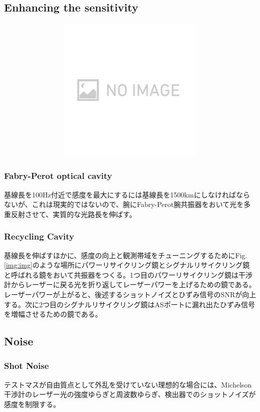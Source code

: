 \subsection{Enhancing the sensitivity}
\begin{figure}[h]
  \begin{center}   
    \includegraphics[width=12cm,height=7cm]{./img.png}
    \caption{}{} \label{img:img133}
  \end{center}
\end{figure}

\subsubsection{Fabry-Perot optical cavity}
基線長を100Hz付近で感度を最大にするには基線長を1500kmにしなければならないが、これは現実的ではないので、腕にFabry-Perot腕共振器をおいて光を多重反射させて、実質的な光路長を伸ばす。

\subsubsection{Recycling Cavity}
基線長を伸ばすほかに、感度の向上と観測帯域をチューニングするためにFig.\ref{img:img}のような場所にパワーリサイクリング鏡とシグナルリサイクリング鏡と呼ばれる鏡をおいて共振器をつくる\cite{meers1988recycling}。1つ目のパワーリサイクリング鏡は干渉計からレーザーに戻る光を折り返してレーザーパワーを上げるための鏡である。レーザーパワーが上がると、後述するショットノイズとひずみ信号のSNRが向上する。次に2つ目のシグナルリサイクリング鏡はASポートに漏れ出たひずみ信号を増幅させるための鏡である。

\subsection{Noise}
\subsubsection{Shot Noise}
テストマスが自由質点として外乱を受けていない理想的な場合には、Michelson干渉計のレーザー光の強度ゆらぎと周波数ゆらぎ、検出器でのショットノイズが感度を制限する。

